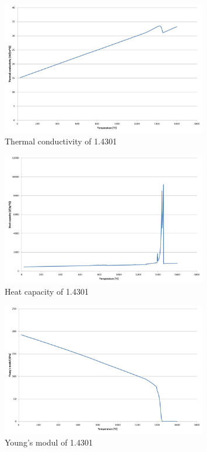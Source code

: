 \begin{figure}[!htbp]
 \centering
 \includegraphics[width=0.8\textwidth]{images/thermalconductivity}
 \caption{Thermal conductivity of 1.4301}
 \label{img:thermalconductivity}
\end{figure}

\begin{figure}[!htbp]
 \centering
 \includegraphics[width=0.8\textwidth]{images/heatcapacity}
 \caption{Heat capacity of 1.4301}
 \label{img:heatcapacity}
\end{figure}

\begin{figure}[!htbp]
 \centering
 \includegraphics[width=0.8\textwidth]{images/youngsmodul}
 \caption{Young's modul of 1.4301}
 \label{img:youngsmodul}
\end{figure}

